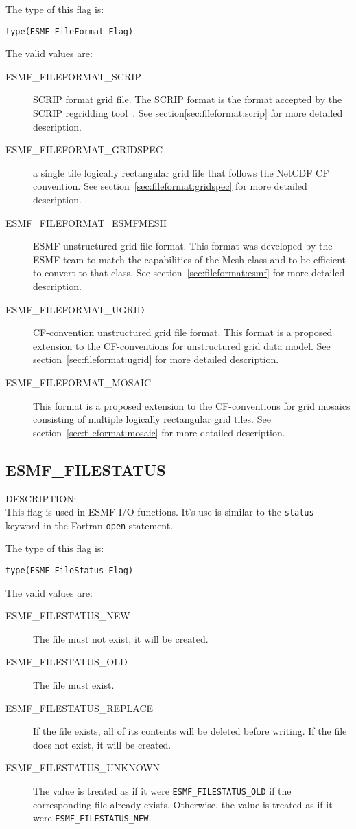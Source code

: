The type of this flag is:

{\tt type(ESMF\_FileFormat\_Flag)}

The valid values are:
\begin{description}
\item [ESMF\_FILEFORMAT\_SCRIP] SCRIP format grid file. The SCRIP format is
  the format accepted by the SCRIP regridding tool~\cite{ref:SCRIP}.  See section\ref{sec:fileformat:scrip} for more detailed description.

\item [ESMF\_FILEFORMAT\_GRIDSPEC]  a single tile logically rectangular
  grid file that follows the NetCDF CF convention. See section~\ref{sec:fileformat:gridspec} for more detailed description.

\item [ESMF\_FILEFORMAT\_ESMFMESH] ESMF unstructured grid file format. This format was developed by the ESMF team to match the capabilities of the Mesh class and to be efficient to convert to that class. See section~\ref{sec:fileformat:esmf} for more detailed description.

\item [ESMF\_FILEFORMAT\_UGRID] CF-convention unstructured grid file format. This format is a proposed extension to the 
CF-conventions for unstructured grid data model. See section~\ref{sec:fileformat:ugrid} for more detailed description.

\item [ESMF\_FILEFORMAT\_MOSAIC] This format is a proposed extension to the 
CF-conventions for grid mosaics consisting of multiple logically rectangular grid
tiles. See section~\ref{sec:fileformat:mosaic} for more detailed description.

\end{description}

\subsection{ESMF\_FILESTATUS}
\label{const:filestatusflag}
{\sf DESCRIPTION:\\}
This flag is used in ESMF I/O functions. It's use is similar to the
{\tt status} keyword in the Fortran {\tt open} statement.

The type of this flag is:

{\tt type(ESMF\_FileStatus\_Flag)}

The valid values are:
\begin{description}
\item [ESMF\_FILESTATUS\_NEW]
      The file must not exist, it will be created.
\item [ESMF\_FILESTATUS\_OLD]
      The file must exist.
\item [ESMF\_FILESTATUS\_REPLACE]
      If the file exists, all of its contents will be deleted before writing.
      If the file does not exist, it will be created.
\item [ESMF\_FILESTATUS\_UNKNOWN]
      The value is treated as if it were {\tt ESMF\_FILESTATUS\_OLD} if
      the corresponding file already exists. Otherwise, the value is
      treated as if it were {\tt ESMF\_FILESTATUS\_NEW}.

\end{description}

